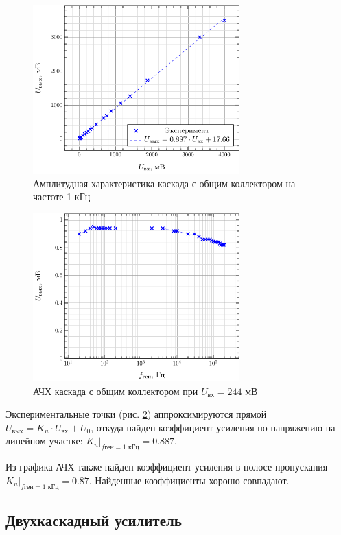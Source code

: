 \begin{figure}[H]
	\centering
	\includegraphics[width=0.71\textwidth]{plot/fig3}
	\caption{Амплитудная характеристика каскада с общим коллектором на частоте 1 кГц}
	\label{fig:18}
\end{figure}

\begin{figure}[H]
	\centering
	\includegraphics[width=0.71\textwidth]{plot/fig4}
	\caption{АЧХ каскада с общим коллектором при $U_\text{вх}= 244 $ мВ}
	\label{fig:19}
\end{figure}


Экспериментальные точки (рис. \ref{fig:19}) аппроксимируются прямой $U_\text{вых}=K_u\cdot U_\text{вх}+U_0$, откуда найден коэффициент усиления по напряжению на линейном участке: $K_u|_{f\text{ген}=1\text{ кГц}}=0.887$.

Из графика АЧХ также найден коэффициент усиления в полосе пропускания $K_u|_{f\text{ген}=1\text{ кГц}}=0.87$. Найденные коэффициенты хорошо совпадают.

\subsection{Двухкаскадный усилитель}

